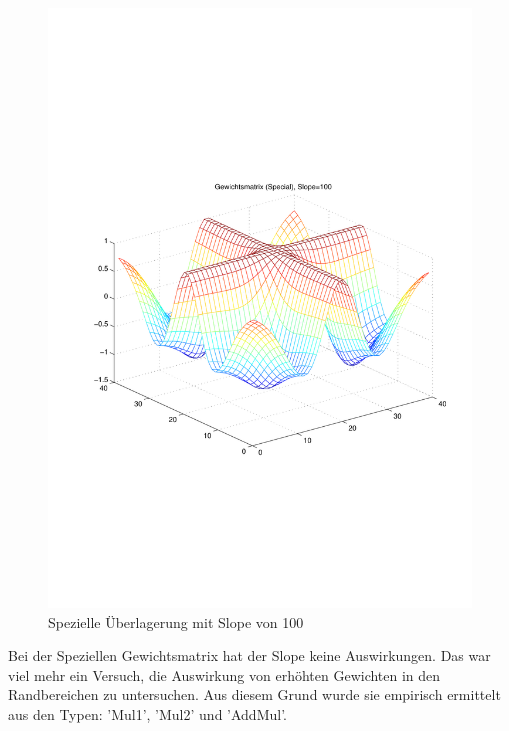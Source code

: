 \begin{figure}[hbt]
	\centering
	\includegraphics[width=0.6\linewidth]{./Bilder/Auswertung/Gewichtsmatrix/Gewichtsmatrix_Special_Slope_100}
	\caption{Spezielle Überlagerung mit Slope von 100}
	\label{Spez100}
\end{figure}

Bei der Speziellen Gewichtsmatrix hat der Slope keine Auswirkungen. Das war viel mehr ein Versuch, die Auswirkung von erhöhten Gewichten in den Randbereichen zu untersuchen. Aus diesem Grund wurde sie empirisch ermittelt aus den Typen: 'Mul1', 'Mul2' und 'AddMul'.